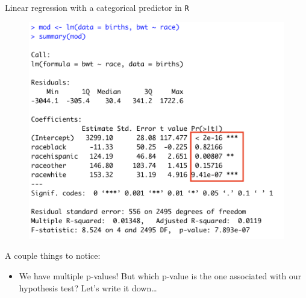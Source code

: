 \documentclass[10pt,t]{beamer}
\begin{document}
\begin{frame}{Linear regression with a categorical predictor in \texttt{R}}

\begin{figure}
	\centering \includegraphics[scale=0.3]{figures/multilevel_cat_lm3.png}
\end{figure}

\vspace{0.1cm}

A couple things to notice:
\begin{itemize}
	\item We have multiple p-values! But which p-value is the one associated with our hypothesis test? Let's write it down\dots
\end{itemize}

\end{frame}
\end{document}
